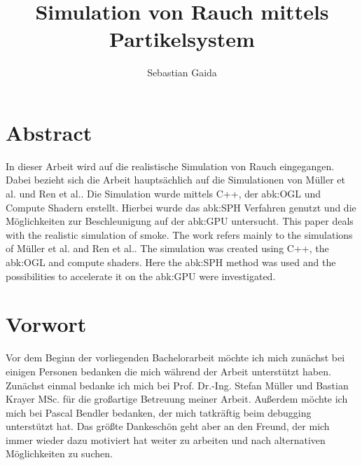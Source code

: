 \documentclass[intern,palatino]{cgBA}
\author{Sebastian Gaida}
\title{Simulation von Rauch mittels Partikelsystem}
\begin{document}
	\maketitle
	\newpage
	\tableofcontents
	\clearpage         %
	


\section*{Abstract}

In dieser Arbeit wird auf die realistische Simulation von Rauch eingegangen. Dabei bezieht sich die Arbeit hauptsächlich auf die Simulationen von Müller et al.\cite{muller2003particle} und Ren et al.\cite{ren2016fast}. Die Simulation wurde mittels C++, der \ac{abk:OGL} und Compute Shadern erstellt. Hierbei wurde das \ac{abk:SPH} Verfahren genutzt und die Möglichkeiten zur Beschleunigung auf der \ac{abk:GPU} untersucht.
\newline \newline
This paper deals with the realistic simulation of smoke. The work refers mainly to the simulations of Müller et al.\cite{muller2003particle} and Ren et al.\cite{ren2016fast}. The simulation was created using C++, the \ac{abk:OGL} and compute shaders. Here the \ac{abk:SPH} method was used and the possibilities to accelerate it on the \ac{abk:GPU} were investigated.
\newpage


\section{Vorwort}

Vor dem Beginn der vorliegenden Bachelorarbeit möchte ich mich zunächst bei einigen Personen bedanken die mich während der Arbeit unterstützt haben.\newline \newline
Zunächst einmal bedanke ich mich bei Prof. Dr.-Ing. Stefan Müller und Bastian Krayer MSc. für die großartige Betreuung meiner Arbeit.\newline
Außerdem möchte ich mich bei Pascal Bendler bedanken, der mich tatkräftig beim debugging unterstützt hat.\newline
Das größte Dankeschön geht aber an den Freund, der mich immer wieder dazu motiviert hat weiter zu arbeiten und nach alternativen Möglichkeiten zu suchen.
\newpage
\end{document}
